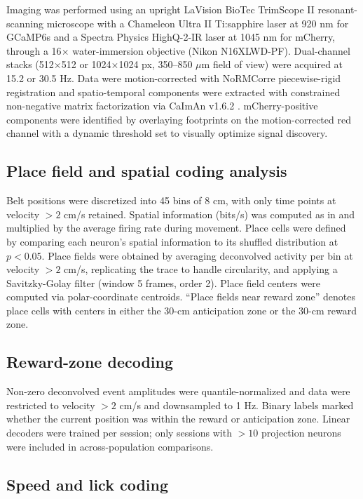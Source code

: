 \documentclass[11pt]{article}
\begin{document}
Imaging was performed using an upright LaVision BioTec TrimScope II resonant-scanning microscope with a Chameleon Ultra II Ti:sapphire laser at 920 nm for GCaMP6s and a Spectra Physics HighQ-2-IR laser at 1045 nm for mCherry, through a 16$\times$ water-immersion objective (Nikon N16XLWD-PF). Dual-channel stacks (512$\times$512 or 1024$\times$1024 px, 350--850 $\mu$m field of view) were acquired at 15.2 or 30.5 Hz. Data were motion-corrected with NoRMCorre piecewise-rigid registration \citep{Pnevmatikakis2017NoRMCorre} and spatio-temporal components were extracted with constrained non-negative matrix factorization via CaImAn v1.6.2 \citep{Giovannucci2019CaImAn}. mCherry-positive components were identified by overlaying footprints on the motion-corrected red channel with a dynamic threshold set to visually optimize signal discovery.

\subsection{Place field and spatial coding analysis}

Belt positions were discretized into 45 bins of 8 cm, with only time points at velocity $>2$ cm/s retained. Spatial information (bits/s) was computed as in \citet{Skaggs1993Information} and multiplied by the average firing rate during movement. Place cells were defined by comparing each neuron's spatial information to its shuffled distribution at $p<0.05$. Place fields were obtained by averaging deconvolved activity per bin at velocity $>2$ cm/s, replicating the trace to handle circularity, and applying a Savitzky-Golay filter (window 5 frames, order 2). Place field centers were computed via polar-coordinate centroids. ``Place fields near reward zone'' denotes place cells with centers in either the 30-cm anticipation zone or the 30-cm reward zone.

\subsection{Reward-zone decoding}

Non-zero deconvolved event amplitudes were quantile-normalized and data were restricted to velocity $>2$ cm/s and downsampled to 1 Hz. Binary labels marked whether the current position was within the reward or anticipation zone. Linear decoders were trained per session; only sessions with $>10$ projection neurons were included in across-population comparisons.

\subsection{Speed and lick coding}
\end{document}
